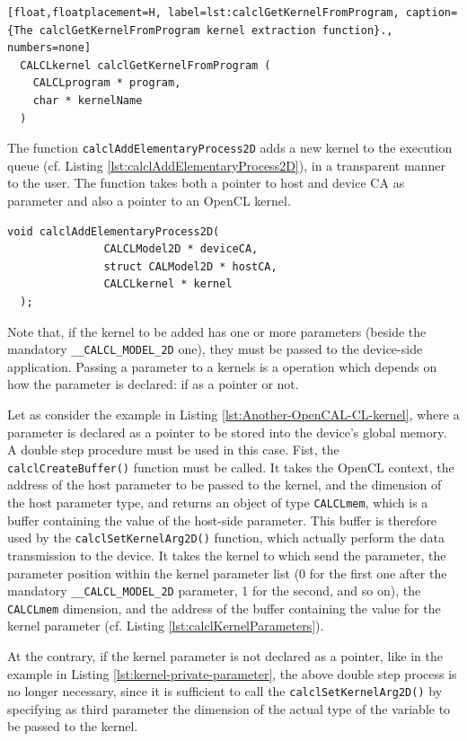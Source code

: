 \begin{lstlisting}[float,floatplacement=H, label=lst:calclGetKernelFromProgram, caption={The calclGetKernelFromProgram kernel extraction function}., numbers=none]
  CALCLkernel calclGetKernelFromProgram (
    CALCLprogram * program,
    char * kernelName
  )
\end{lstlisting}

The function \verb'calclAddElementaryProcess2D' adds a new kernel to
the execution queue (cf. Listing
\ref{lst:calclAddElementaryProcess2D}), in a transparent manner to the
user. The function takes both a pointer to host and device CA as
parameter and also a pointer to an OpenCL kernel.

\begin{lstlisting}[float,floatplacement=TH, label=lst:calclAddElementaryProcess2D, caption=The calclAddElementaryProcess2D function., numbers=none]
  void calclAddElementaryProcess2D(
               CALCLModel2D * deviceCA,
               struct CALModel2D * hostCA,
               CALCLkernel * kernel
  );
\end{lstlisting}

Note that, if the kernel to be added has one or more parameters
(beside the mandatory \verb'__CALCL_MODEL_2D' one), they must be
passed to the device-side application. Passing a parameter to a
kernels is a operation which depends on how the parameter is declared:
if as a pointer or not.

Let as consider the example in Listing
\ref{lst:Another-OpenCAL-CL-kernel}, where a parameter is declared as
a pointer to be stored into the device's global memory. A double step
procedure must be used in this case. Fist, the
\verb'calclCreateBuffer()' function must be called. It takes the
OpenCL context, the address of the host parameter to be passed to the
kernel, and the dimension of the host parameter type, and returns an
object of type \verb'CALCLmem', which is a buffer containing the value
of the host-side parameter. This buffer is therefore used by the
\verb'calclSetKernelArg2D()' function, which actually perform the data
transmission to the device. It takes the kernel to which send the
parameter, the parameter position within the kernel parameter list (0
for the first one after the mandatory \verb'__CALCL_MODEL_2D'
parameter, 1 for the second, and so on), the \verb'CALCLmem'
dimension, and the address of the buffer containing the value for the
kernel parameter (cf. Listing \ref{lst:calclKernelParameters}).

At the contrary, if the kernel parameter is not declared as a pointer,
like in the example in Listing \ref{lst:kernel-private-parameter}, the
above double step process is no longer necessary, since it is
sufficient to call the \verb'calclSetKernelArg2D()' by specifying as
third parameter the dimension of the actual type of the variable to be
passed to the kernel.

